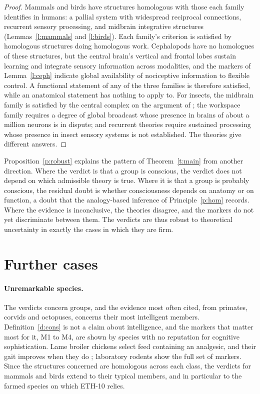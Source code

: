 \documentclass{situationist-preprint}
\begin{document}
\begin{proof}
Mammals and birds have structures homologous with those each family identifies in humans: a pallial system with widespread reciprocal connections, recurrent sensory processing, and midbrain integrative structures (Lemmas~\ref{l:mammals} and \ref{l:birds}). Each family's criterion is satisfied by homologous structures doing homologous work. Cephalopods have no homologues of these structures, but the central brain's vertical and frontal lobes sustain learning and integrate sensory information across modalities, and the markers of Lemma~\ref{l:ceph} indicate global availability of nociceptive information to flexible control. A functional statement of any of the three families is therefore satisfied, while an anatomical statement has nothing to apply to. For insects, the midbrain family is satisfied by the central complex on the argument of \citet{Barron2016}; the workspace family requires a degree of global broadcast whose presence in brains of about a million neurons is in dispute; and recurrent theories require sustained processing whose presence in insect sensory systems is not established. The theories give different answers.
\end{proof}

Proposition~\ref{p:robust} explains the pattern of Theorem~\ref{t:main} from another direction. Where the verdict is that a group is conscious, the verdict does not depend on which admissible theory is true. Where it is that a group is probably conscious, the residual doubt is whether consciousness depends on anatomy or on function, a doubt that the analogy-based inference of Principle~\ref{p:hom} records. Where the evidence is inconclusive, the theories disagree, and the markers do not yet discriminate between them. The verdicts are thus robust to theoretical uncertainty in exactly the cases in which they are firm.

\section{Further cases}

\paragraph{Unremarkable species.} The verdicts concern groups, and the evidence most often cited, from primates, corvids and octopuses, concerns their most intelligent members. Definition~\ref{d:cons} is not a claim about intelligence, and the markers that matter most for it, M1 to M4, are shown by species with no reputation for cognitive sophistication. Lame broiler chickens select feed containing an analgesic, and their gait improves when they do \citep{Danbury2000}; laboratory rodents show the full set of markers. Since the structures concerned are homologous across each class, the verdicts for mammals and birds extend to their typical members, and in particular to the farmed species on which ETH-10 relies.
\end{document}
